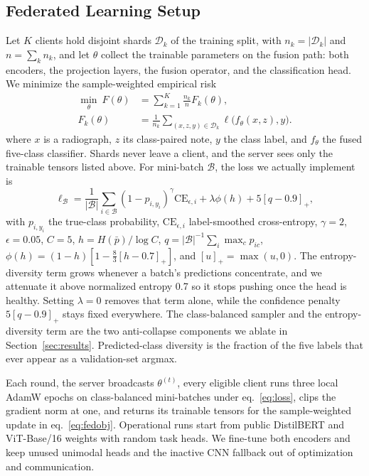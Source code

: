 \documentclass[letterpaper, conference]{IEEEtran}
\begin{document}
\subsection{Federated Learning Setup}
\label{sec:objective}
Let $K$ clients hold disjoint shards $\mathcal{D}_k$ of the training split, with
$n_k=|\mathcal{D}_k|$ and $n=\sum_k n_k$, and let $\theta$ collect the trainable
parameters on the fusion path: both encoders, the projection layers, the fusion
operator, and the classification head. We minimize the sample-weighted empirical
risk
\begin{equation}
\begin{aligned}
\min_{\theta}\ F(\theta)&=\sum_{k=1}^{K}\frac{n_k}{n}F_k(\theta),\\[-2pt]
F_k(\theta)&=\frac{1}{n_k}\!\!\sum_{(x,z,y)\in\mathcal{D}_k}\!\!\ell\big(f_\theta(x,z),y\big).
\end{aligned}
\label{eq:fedobj}
\end{equation}
where $x$ is a radiograph, $z$ its class-paired note, $y$ the class label, and
$f_\theta$ the fused five-class classifier. Shards never leave a client, and the
server sees only the trainable tensors listed above. For mini-batch
$\mathcal{B}$, the loss we actually implement is
\begin{equation}
\ell_{\mathcal B}=\frac{1}{|\mathcal B|}\sum_{i\in\mathcal B}
(1-p_{i,y_i})^{\gamma}\mathrm{CE}_{\epsilon,i}
+\lambda\phi(h)+5[q-0.9]_+,
\label{eq:loss}
\end{equation}
with $p_{i,y_i}$ the true-class probability, $\mathrm{CE}_{\epsilon,i}$
label-smoothed cross-entropy, $\gamma{=}2$, $\epsilon{=}0.05$, $C{=}5$,
$h=H(\bar p)/\log C$, $q=|\mathcal B|^{-1}\sum_i\max_c p_{ic}$,
$\phi(h)=(1-h)[1-\tfrac{8}{3}[h-0.7]_+]$, and $[u]_+=\max(u,0)$.
The entropy-diversity term grows whenever a batch's predictions concentrate, and we
attenuate it above normalized entropy 0.7 so it stops pushing once the head is
healthy. Setting $\lambda{=}0$ removes that term alone, while the confidence
penalty $5[q-0.9]_+$ stays fixed everywhere. The class-balanced sampler and the
entropy-diversity term are the two anti-collapse components we ablate in
Section~\ref{sec:results}. Predicted-class diversity is the fraction of the five
labels that ever appear as a validation-set argmax.

Each round, the server broadcasts $\theta^{(t)}$, every eligible client runs three
local AdamW epochs on class-balanced mini-batches under eq.~\eqref{eq:loss}, clips the
gradient norm at one, and returns its trainable tensors for the sample-weighted
update in eq.~\eqref{eq:fedobj}. Operational runs start from public DistilBERT and
ViT-Base/16 weights with random task heads. We fine-tune both encoders and keep
unused unimodal heads and the inactive CNN fallback out of optimization and
communication.
\end{document}
